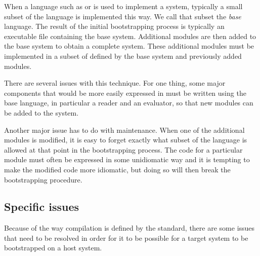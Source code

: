 When a language such as \clanguage{} or \cplusplus{} is used to
implement a \commonlisp{} system, typically a small subset of the
\commonlisp{} language is implemented this way.  We call that subset
the \emph{base} language.  The result of the initial bootstrapping
process is typically an executable file containing the base system.
Additional modules are then added to the base system to obtain a
complete \commonlisp{} system.  These additional modules must be
implemented in a subset of \commonlisp{} defined by the base system
and previously added modules.

There are several issues with this technique.  For one thing, some
major components that would be more easily expressed in \commonlisp{}
must be written using the base language, in particular a reader and an
evaluator, so that new modules can be added to the system.

Another major issue has to do with maintenance.  When one of the
additional modules is modified, it is easy to forget exactly what
subset of the \commonlisp{} language is allowed at that point in the
bootstrapping process.  The code for a particular module must often be
expressed in some unidiomatic way and it is tempting to make the
modified code more idiomatic, but doing so will then break the
bootstrapping procedure.

\subsection{Specific \commonlisp{} issues}

Because of the way compilation is defined by the \commonlisp{}
standard, there are some issues that need to be resolved in order for
it to be possible for a target \commonlisp{} system to be bootstrapped
on a host \commonlisp{} system.
